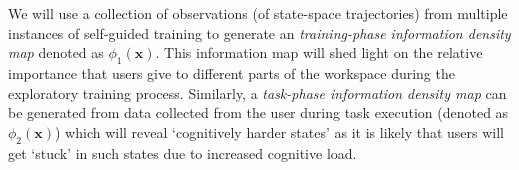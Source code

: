 \documentclass[12pt]{article}
\begin{document}

We will use a collection of observations (of state-space trajectories) from multiple instances of self-guided training to generate an \textit{training-phase information density map} denoted as $\phi_{1}(\boldsymbol{x})$. This information map will shed light on the relative importance that users give to different parts of the workspace during the exploratory training process. Similarly, a \textit{task-phase information density map} can be generated from data collected from the user during task execution (denoted as $\phi_{2}(\boldsymbol{x})$) which will reveal `cognitively harder states' as it is likely that users will get `stuck' in such states due to increased cognitive load. 
\end{document}
